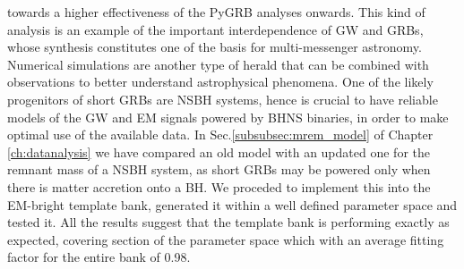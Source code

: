 \documentclass[binding=0.6cm, LaM]{sapthesis}
\begin{document}
	towards a higher effectiveness of the {\ttfamily PyGRB} analyses onwards.
	This kind of analysis is an example of the important interdependence of GW and GRBs,
	whose synthesis constitutes one of the basis for multi-messenger astronomy.
	Numerical simulations are another type of herald that can be combined with observations 
	to better understand astrophysical phenomena.
	One of the likely progenitors of short GRBs are NSBH systems, 
	hence is crucial to have reliable models of the GW and EM signals powered by BHNS binaries,
	in order  to  make optimal use of the available data.
	In Sec.\ref{subsubsec:mrem_model} of Chapter \ref{ch:datanalysis} we have compared an old model \cite{50}  
	with an updated one \cite{54} for the remnant mass of a NSBH system,
	as short GRBs may be powered only when there is matter accretion onto a BH.
	We proceded to implement this into the EM-bright template bank,
	generated  it within a well defined parameter space and tested it.
	All the results suggest that the template bank is performing exactly as expected,
	covering section of the parameter space which 
	with an average fitting factor for the entire bank of 0.98.


\backmatter
\cleardoublepage




\end{document}
